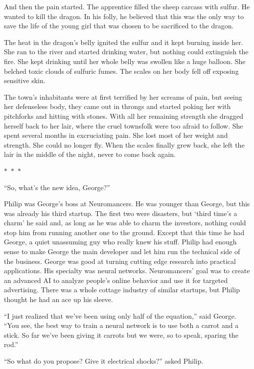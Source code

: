 \documentclass{memoir}
\newcommand{\starbreak}{%
\begin{center}
  $\ast$~$\ast$~$\ast$
\end{center}
}
\begin{document}
And then the pain started. The apprentice filled the sheep carcass with sulfur. He wanted to kill the dragon. In his folly, he believed that this was the only way to save the life of the young girl that was chosen to be sacrificed to the dragon. 

The heat in the dragon's belly ignited the sulfur and it kept burning inside her. She ran to the river and started drinking water, but nothing could extinguish the fire. She kept drinking until her whole belly was swollen like a huge balloon. She belched toxic clouds of sulfuric fumes. The scales on her body fell off exposing sensitive skin. 

The town's inhabitants were at first terrified by her screams of pain, but seeing her defenseless body, they came out in throngs and started poking her with pitchforks and hitting with stones. With all her remaining strength she dragged herself back to her lair, where the cruel townsfolk were too afraid to follow. She spent several months in excruciating pain. She lost most of her weight and strength. She could no longer fly. When the scales finally grew back, she left the lair in the middle of the night, never to come back again. 

\starbreak

``So, what's the new idea, George?'' 

Philip was George's boss at Neuromancers. He was younger than George, but this was already his third startup. The first two were disasters, but `third time's a charm' he said and, as long as he was able to charm the investors, nothing could stop him from running another one to the ground. Except that this time he had George, a quiet unassuming guy who really knew his stuff. Philip had enough sense to make George the main developer and let him run the technical side of the business. George was good at turning cutting edge research into practical applications. His specialty was neural networks. Neuromancers' goal was to create an advanced AI to analyze people's online behavior and use it for targeted advertising. There was a whole cottage industry of similar startups, but Philip thought he had an ace up his sleeve.

``I just realized that we've been using only half of the equation,'' said George. ``You see, the best way to train a neural network is to use both a carrot and a stick. So far we've been giving it carrots but we were, so to speak, sparing the rod.''

``So what do you propose? Give it electrical shocks?'' asked Philip.
\end{document}
